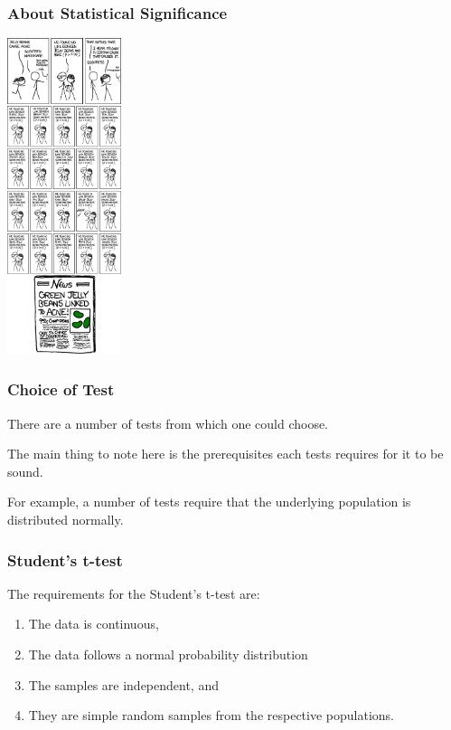 \begin{frame}
\frametitle{About Statistical Significance}
\begin{changemargin}{1cm}

\begin{center}
\includegraphics[width=0.25\textwidth]{images/significant.png}
\end{center}

\end{changemargin}
\end{frame}

\begin{frame}
\frametitle{Choice of Test}
\begin{changemargin}{1cm}

There are a number of tests from
which one could choose. 

The main thing to note here is the
prerequisites each tests requires for it to be sound.

For example, a number of tests require that the underlying
population is distributed normally.

\end{changemargin}
\end{frame}

\begin{frame}
\frametitle{Student's t-test}
\begin{changemargin}{1cm}

The requirements for the Student's t-test are: 
\begin{enumerate}
	\item The data is continuous, 
	\item The data follows a normal probability distribution
	\item The samples are independent, and
	\item They are simple random samples from the respective populations.
\end{enumerate}
\end{changemargin}
\end{frame}

